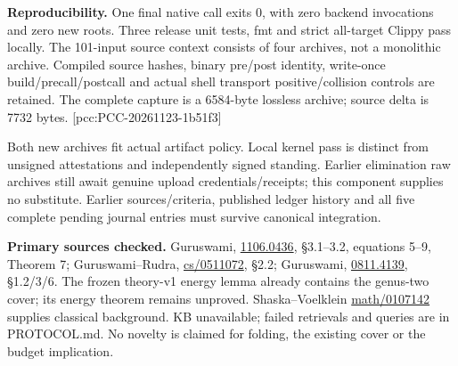 \documentclass[10pt]{article}
\begin{document}
\textbf{Reproducibility.} One final native call exits 0, with zero backend
invocations and zero new roots. Three release unit tests, fmt and strict
all-target Clippy pass locally. The 101-input source context consists of four
archives, not a monolithic archive. Compiled source hashes, binary pre/post
identity, write-once build/precall/postcall and actual shell transport
positive/collision controls are retained. The complete capture is a 6584-byte
lossless archive; source delta is 7732 bytes. [pcc:PCC-20261123-1b51f3]

Both new archives fit actual artifact policy. Local kernel pass is distinct
from unsigned attestations and independently signed standing. Earlier
elimination raw archives still await genuine upload credentials/receipts;
this component supplies no substitute. Earlier sources/criteria, published
ledger history and all five complete pending journal entries must survive
canonical integration.

\textbf{Primary sources checked.} Guruswami,
\href{https://arxiv.org/pdf/1106.0436}{1106.0436}, \S3.1--3.2, equations 5--9, Theorem 7;
Guruswami--Rudra, \href{https://arxiv.org/pdf/cs/0511072}{cs/0511072}, \S2.2;
Guruswami, \href{https://www.ias.edu/sites/default/files/math/csdm/07-08/vguruswami_artin_automorphisms_cyclotomic.pdf}{0811.4139}, \S1.2/3/6.
The frozen theory-v1 energy lemma already contains the genus-two cover;
its energy theorem remains unproved. Shaska--Voelklein
\href{https://arxiv.org/pdf/math/0107142}{math/0107142} supplies classical
background. KB unavailable; failed retrievals and queries are in PROTOCOL.md.
No novelty is claimed for folding, the existing cover or the budget implication.
\end{document}
